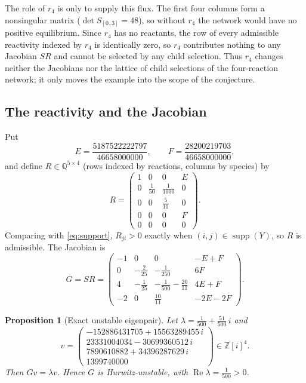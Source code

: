 \documentclass[11pt,a4paper]{article}
\newtheorem{proposition}[theorem]{Proposition}
\theoremstyle{definition}
\theoremstyle{remark}
\newcommand{\Q}{\mathbb{Q}}
\newcommand{\Z}{\mathbb{Z}}
\newcommand{\re}{\operatorname{Re}}
\newcommand{\supp}{\operatorname{supp}}
\newcommand{\Ecst}{E}
\newcommand{\Fcst}{F}
\begin{document}
The role of $r_4$ is only to supply this flux. The first four columns form a nonsingular matrix ($\det S_{[0..3]}=48$), so without $r_4$ the network would have no positive equilibrium. Since $r_4$ has no reactants, the row of every admissible reactivity indexed by $r_4$ is identically zero, so $r_4$ contributes nothing to any Jacobian $SR$ and cannot be selected by any child selection. Thus $r_4$ changes neither the Jacobians nor the lattice of child selections of the four-reaction network; it only moves the example into the scope of the conjecture.

\subsection{The reactivity and the Jacobian}

Put
\begin{equation}\label{eq:EF}
\Ecst=\frac{5187522222797}{46658000000},\qquad
\Fcst=\frac{28200219703}{46658000000},
\end{equation}
and define $R\in\Q^{5\times4}$ (rows indexed by reactions, columns by species) by
\begin{equation}\label{eq:R}
R=\begin{pmatrix}
1&0&0&\Ecst\\
0&\tfrac1{50}&\tfrac1{1000}&0\\
0&0&\tfrac5{11}&0\\
0&0&0&\Fcst\\
0&0&0&0
\end{pmatrix}.
\end{equation}
Comparing with \eqref{eq:support}, $R_{ji}>0$ exactly when $(i,j)\in\supp(Y)$, so $R$ is admissible. The Jacobian is
\begin{equation}\label{eq:G}
G=SR=\begin{pmatrix}
-1&0&0&-\Ecst+\Fcst\\[2pt]
0&-\tfrac{2}{25}&-\tfrac{1}{250}&6\Fcst\\[2pt]
4&-\tfrac{1}{25}&-\tfrac{1}{500}-\tfrac{20}{11}&4\Ecst+\Fcst\\[2pt]
-2&0&\tfrac{10}{11}&-2\Ecst-2\Fcst
\end{pmatrix}.
\end{equation}

\begin{proposition}[Exact unstable eigenpair]\label{prop:eigenpair}
Let $\lambda=\tfrac1{500}+\tfrac{51}{500}\,i$ and
\[
v=\begin{pmatrix}
-152886431705+15563289455\,i\\
23331004034-30699360512\,i\\
7890610882+34396287629\,i\\
1399740000
\end{pmatrix}\in\Z[i]^4 .
\]
Then $Gv=\lambda v$. Hence $G$ is Hurwitz-unstable, with $\re\lambda=\tfrac1{500}>0$.
\end{proposition}
\end{document}
